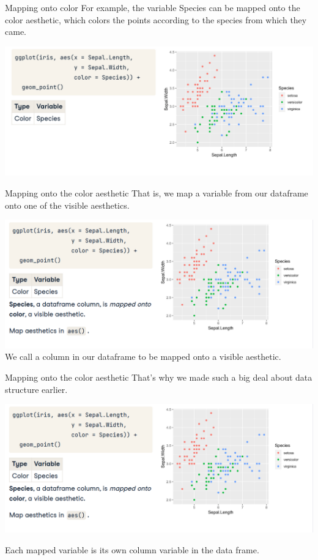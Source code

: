 \documentclass[
  ignorenonframetext,
]{beamer}
\begin{document}
\begin{frame}{Mapping onto color}
\label{mapping-onto-color}
For example, the variable Species can be mapped onto the color
aesthetic, which colors the points according to the species from which
they came.

\includegraphics{../images/im136.png}
\end{frame}

\begin{frame}{Mapping onto the color aesthetic}
\label{mapping-onto-the-color-aesthetic}
That is, we map a variable from our dataframe onto one of the visible
aesthetics.

\includegraphics{../images/im137.png} We call a column in our dataframe
to be mapped onto a visible aesthetic.
\end{frame}

\begin{frame}{Mapping onto the color aesthetic}
\label{mapping-onto-the-color-aesthetic-1}
That's why we made such a big deal about data structure earlier.

\includegraphics{../images/im137.png}

Each mapped variable is its own column variable in the data frame.
\end{frame}
\end{document}
